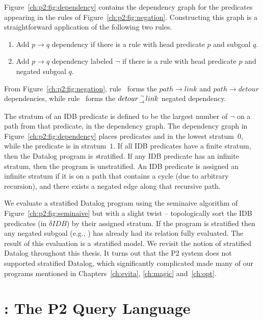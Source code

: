 Figure~\ref{ch:p2:fig:dependency} contains the dependency graph for the predicates
appearing in the rules of Figure~\ref{ch:p2:fig:negation}. Constructing this graph
is a straightforward application of the following two rules.
\begin{enumerate}
  \ssp
  \item Add $p \rightarrow q$ dependency if there is a rule with head predicate $p$ and subgoal $q$.
  \item Add $p \rightarrow q$ dependency labeled $\neg$ if there is a rule with head predicate $p$ and negated subgoal $q$.
\end{enumerate}
From Figure~\ref{ch:p2:fig:negation}, rule~ forms the $path \rightarrow
link$ and $path \rightarrow detour$ dependencies, while rule~ forms the
$detour {\neg \atop \rightarrow} link$ negated dependency. 

The stratum of an IDB predicate is defined to be the largest number of $\neg$
on a path from that predicate, in the dependency graph.  The dependency graph
in Figure~\ref{ch:p2:fig:dependency} places predicates  and
 in the lowest stratum~$0$, while the  predicate is in
stratum~$1$.  If all IDB predicates have a finite stratum, then the Datalog
program is {\emph stratified}.  If any IDB predicate has an infinite stratum,
then the program is unstratified.  An IDB predicate is assigned an infinite
stratum if it is on a path that contains a cycle (due to arbitrary recursion),
and there exists a negated edge along that recursive path.

We evaluate a stratified Datalog program using the seminaive algorithm of
Figure~\ref{ch:p2:fig:seminaive} but with a slight twist -- topologically sort
the IDB predicates (in $\delta IDB$) by their assigned stratum.  If the program is
stratified then any negated subgoal (e.g., ) has already had its
relation fully evaluated.  The result of this evaluation is a {\emph stratified
model}. We revisit the notion of stratified Datalog throughout this thesis. It turns
out that the P2 system does not supported stratified Datalog, which significantly
complicated made many of our \OVERLOG programs mentioned in Chapters~\ref{ch:evita}, 
\ref{ch:magic} and~\ref{ch:opt}.


\section{\OVERLOG: The P2 Query Language}
\label{ch:p2:sec:overlog}

